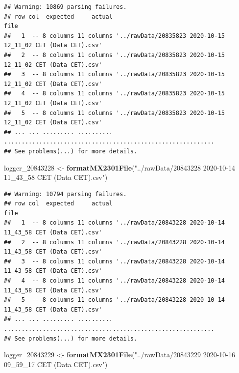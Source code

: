 \documentclass[]{article}
\newenvironment{Shaded}{\begin{snugshade}}{\end{snugshade}}
\newcommand{\DecValTok}[1]{\textcolor[rgb]{0.00,0.00,0.81}{#1}}
\newcommand{\KeywordTok}[1]{\textcolor[rgb]{0.13,0.29,0.53}{\textbf{#1}}}
\newcommand{\NormalTok}[1]{#1}
\newcommand{\StringTok}[1]{\textcolor[rgb]{0.31,0.60,0.02}{#1}}
\begin{document}
\begin{verbatim}
## Warning: 10869 parsing failures.
## row col  expected     actual                                                         file
##   1  -- 8 columns 11 columns '../rawData/20835823 2020-10-15 12_11_02 CET (Data CET).csv'
##   2  -- 8 columns 11 columns '../rawData/20835823 2020-10-15 12_11_02 CET (Data CET).csv'
##   3  -- 8 columns 11 columns '../rawData/20835823 2020-10-15 12_11_02 CET (Data CET).csv'
##   4  -- 8 columns 11 columns '../rawData/20835823 2020-10-15 12_11_02 CET (Data CET).csv'
##   5  -- 8 columns 11 columns '../rawData/20835823 2020-10-15 12_11_02 CET (Data CET).csv'
## ... ... ......... .......... ............................................................
## See problems(...) for more details.
\end{verbatim}

\begin{Shaded}
\begin{Highlighting}[]
\NormalTok{logger_}\DecValTok{20843228}\NormalTok{ <-}\StringTok{ }\KeywordTok{formatMX2301File}\NormalTok{(}\StringTok{"../rawData/20843228 2020-10-14 11_43_58 CET (Data CET).csv"}\NormalTok{)}
\end{Highlighting}
\end{Shaded}

\begin{verbatim}
## Warning: 10794 parsing failures.
## row col  expected     actual                                                         file
##   1  -- 8 columns 11 columns '../rawData/20843228 2020-10-14 11_43_58 CET (Data CET).csv'
##   2  -- 8 columns 11 columns '../rawData/20843228 2020-10-14 11_43_58 CET (Data CET).csv'
##   3  -- 8 columns 11 columns '../rawData/20843228 2020-10-14 11_43_58 CET (Data CET).csv'
##   4  -- 8 columns 11 columns '../rawData/20843228 2020-10-14 11_43_58 CET (Data CET).csv'
##   5  -- 8 columns 11 columns '../rawData/20843228 2020-10-14 11_43_58 CET (Data CET).csv'
## ... ... ......... .......... ............................................................
## See problems(...) for more details.
\end{verbatim}

\begin{Shaded}
\begin{Highlighting}[]
\NormalTok{logger_}\DecValTok{20843229}\NormalTok{ <-}\StringTok{ }\KeywordTok{formatMX2301File}\NormalTok{(}\StringTok{"../rawData/20843229 2020-10-16 09_59_17 CET (Data CET).csv"}\NormalTok{)}
\end{Highlighting}
\end{Shaded}
\end{document}
